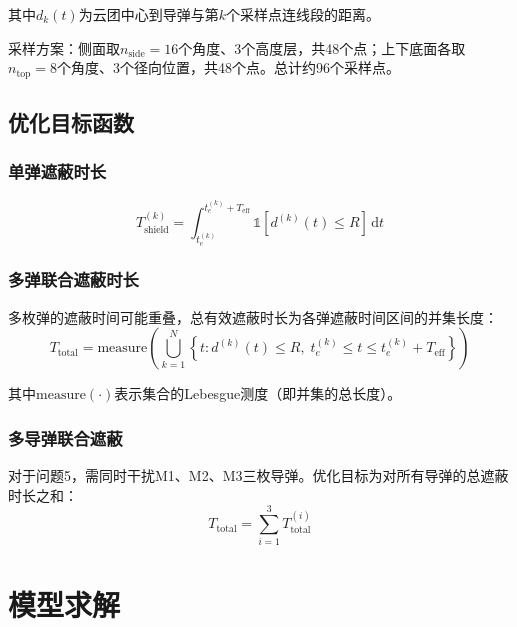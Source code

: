 \documentclass[12pt,a4paper]{article}
\begin{document}
其中$d_k(t)$为云团中心到导弹与第$k$个采样点连线段的距离。

采样方案：侧面取$n_{\text{side}} = 16$个角度、3个高度层，共48个点；上下底面各取$n_{\text{top}} = 8$个角度、3个径向位置，共48个点。总计约96个采样点。

\subsection{优化目标函数}

\subsubsection{单弹遮蔽时长}

\begin{equation}
    T_{\text{shield}}^{(k)} = \int_{t_e^{(k)}}^{t_e^{(k)} + T_{\text{eff}}} \mathbb{1}[d^{(k)}(t) \leq R] \, \mathrm{d}t
    \label{eq:single_shield}
\end{equation}

\subsubsection{多弹联合遮蔽时长}

多枚弹的遮蔽时间可能重叠，总有效遮蔽时长为各弹遮蔽时间区间的并集长度：
\begin{equation}
    T_{\text{total}} = \text{measure}\left(\bigcup_{k=1}^{N} \left\{t : d^{(k)}(t) \leq R, \; t_e^{(k)} \leq t \leq t_e^{(k)} + T_{\text{eff}}\right\}\right)
    \label{eq:total_shield}
\end{equation}

其中$\text{measure}(\cdot)$表示集合的Lebesgue测度（即并集的总长度）。

\subsubsection{多导弹联合遮蔽}

对于问题5，需同时干扰M1、M2、M3三枚导弹。优化目标为对所有导弹的总遮蔽时长之和：
\begin{equation}
    T_{\text{total}} = \sum_{i=1}^{3} T_{\text{total}}^{(i)}
    \label{eq:multi_missile_shield}
\end{equation}


\section{模型求解}
\end{document}

